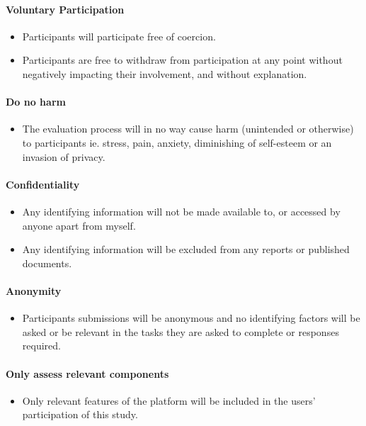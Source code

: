 \documentclass[lettersize,journal]{IEEEtran}
\begin{document}
		\paragraph{Voluntary Participation}
		\begin{itemize}
			\item Participants will participate free of coercion.
			\item Participants are free to withdraw from participation at any point without negatively impacting their involvement, and without explanation.
		\end{itemize}

		\paragraph{Do no harm}
		\begin{itemize}
			\item The evaluation process will in no way cause harm (unintended or otherwise) to participants ie. stress, pain, anxiety,
				diminishing of self-esteem or an invasion of privacy.

		\end{itemize}
		\paragraph{Confidentiality}
		\begin{itemize}
			\item Any identifying information will not be made available to, or accessed by anyone apart from myself.
			\item Any identifying information will be excluded from any reports or published documents.
		\end{itemize}
		\paragraph{Anonymity}
		\begin{itemize}
			\item Participants submissions will be anonymous and no identifying factors will be asked or be relevant in the tasks they are asked to 
				complete or responses required.
		\end{itemize}
		\paragraph{Only assess relevant components}
		\begin{itemize}
			\item Only relevant features of the platform will be included in the users' participation of this study.
		\end{itemize}
		
\end{document}
